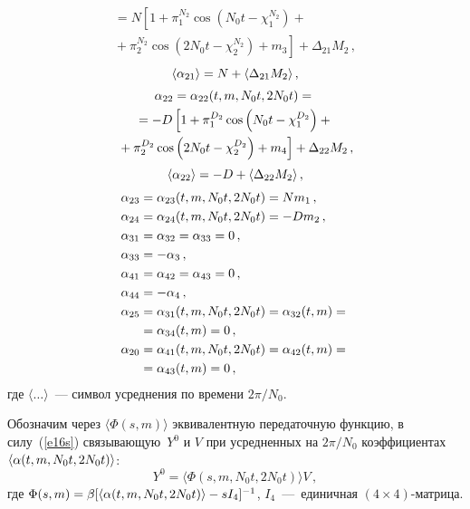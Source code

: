 \begin{multicols}{2}
\begin{multline*}
{}=N \left[1+\pi_1^{N_2} \cos \left(N_0t  -\chi_1^{N_2}\right)+{}\right.\\
\left.{} + \pi_2^{N_2} \cos \left(2N_0t -\chi_2^{N_2}\right)+m_3\right]+\Delta_{21}M_2\,,
\end{multline*}
\begin{equation*}
 \langle\alpha_{21}\rangle=N+\langle\Delta_{21}M_2\rangle\,,
\end{equation*}
\begin{multline*}
 \alpha_{22} =\alpha_{22} (t,m, N_0t, 2N_0t)={}\\
{}= - D \left[1+ \pi_1^{D_2} \cos \left(N_0t -\chi_1^{D_2}\right)+{}\right.\\
\left.{} + \pi_2^{D_2} \cos \left(2N_0t -\chi_2^{D_2}\right)+ m_4\right]+\Delta_{22}M_2\,,
\end{multline*}
\begin{equation*}
 \langle\alpha_{22} \rangle=-D+\langle\Delta_{22}M_2\rangle\,,
\end{equation*}
\begin{align}
 \alp_{23} &=\alp_{23} (t, m, N_0t, 2N_0t)= Nm_1\,,\notag\\%
 \alp_{24} &=\alp_{24} (t,m, N_0t, 2N_0t) = - D m_2\,,\notag\\%
  \alp_{31} &=\alp_{32}=\alp_{33}=0\,, \notag\\%
 \alp_{33} &= -\alp_3\,, \notag\\%
 \alp_{41} &=\alp_{42}=\alp_{43}=0\,,\notag\\%
 \alp_{44} &=-\alp_4\,,\notag\\%
 \alp_{25}&=\alp_{31} (t, m, N_0t, 2N_0t)= \alp_{32} (t, m) ={}\notag\\
{}&= \alp_{34} (t, m)=0\,,\notag\\%
 \alp_{20} &=\alp_{41} (t, m, N_0t, 2N_0t)= \alp_{42} (t, m)={}\notag\\%
{}&= \alp_{43} (t, m)=0\,,\label{e19s}
 \end{align}
где $\langle\ldots \rangle$~--- символ усреднения по времени $2\pi/N_0$.

Обозначим через $\langle\Phi (s, m)\rangle$ эквивалентную
передаточную функцию, в силу~(\ref{e16s}) связывающую~$Y^0$ и $V$ при
усредненных на $2\pi / N_0$ коэффициентах
$\langle \alpha (t,m,N_0t, 2N_0 t)\rangle$:
\begin{equation}
Y^0 =\langle \Phi (s, m, N_0t, 2N_0 t)\rangle V\,,\label{e20s}
\end{equation}
 где $\Phi (s,m) = \beta [ \langle \alpha(t,m, N_0t, 2N_0 t)\rangle - s I_4 ]^{-1}$,
$ I_4 $~---~единичная $(4\times 4)$-матрица.


\end{multicols}
